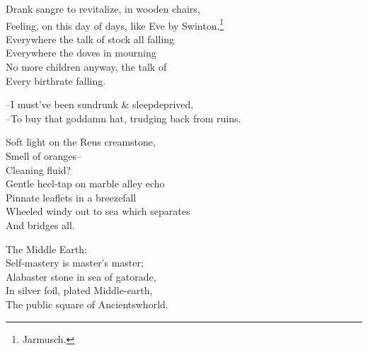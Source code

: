 Drank sangre to revitalize, in wooden chairs, \\
Feeling, on this day of days, like Eve by Swinton.\footnote{Jarmusch.} \\
Everywhere the talk of stock all falling \\
Everywhere the doves in mourning \\
No more children anyway, the talk of \\
Every birthrate falling. 

--I must've been sundrunk \& sleepdeprived, \\
--To buy that goddamn hat, trudging back from ruins. 

Soft light on the Reus creamstone, \\
Smell of oranges-- \\
Cleaning fluid? \\
Gentle heel-tap on marble alley echo \\
Pinnate leaflets in a breezefall \\
Wheeled windy out to sea which separates \\
And bridges all.

The Middle Earth: \\
Self-mastery is master's master; \\
Alabaster stone in sea of gatorade, \\
In silver foil, plated Middle-earth, \\
The public square of Ancientswhorld.